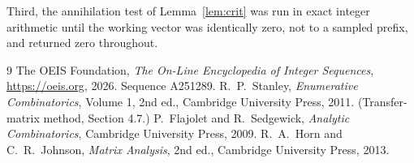 \documentclass[11pt,a4paper]{article}
\theoremstyle{plain}
\theoremstyle{definition}
\begin{document}
Third, the annihilation test of Lemma~\ref{lem:crit} was run in exact integer arithmetic
until the working vector was identically zero, not to a sampled prefix, and returned zero
throughout.

\begin{thebibliography}{9}
 The OEIS Foundation, \emph{The On-Line Encyclopedia of Integer
Sequences}, \url{https://oeis.org}, 2026. Sequence A251289.
 R.~P.~Stanley, \emph{Enumerative Combinatorics}, Volume 1, 2nd ed.,
Cambridge University Press, 2011. (Transfer-matrix method, Section 4.7.)
 P.~Flajolet and R.~Sedgewick, \emph{Analytic Combinatorics}, Cambridge
University Press, 2009.
 R.~A.~Horn and C.~R.~Johnson, \emph{Matrix Analysis}, 2nd ed., Cambridge
University Press, 2013.
\end{thebibliography}
\end{document}
